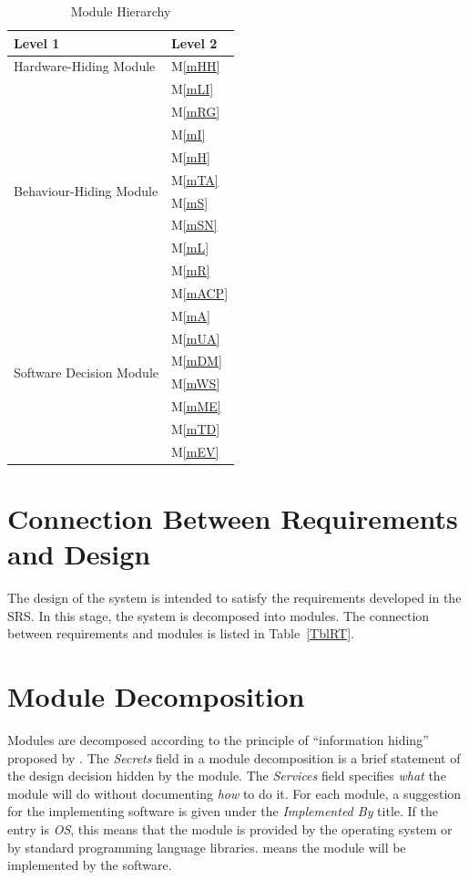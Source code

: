 \documentclass[12pt, titlepage]{article}
\newcommand{\mref}[1]{M\ref{#1}}
\begin{document}
\begin{table}[H]
\centering
\begin{tabular}{p{} p{}}
\toprule
\textbf{Level 1} & \textbf{Level 2}\\
\midrule

{Hardware-Hiding Module}
& \mref{mHH}\\
\midrule

\multirow{10}{0.3\textwidth}{Behaviour-Hiding Module} 
& \mref{mLI}\\
& \mref{mRG}\\
& \mref{mI}\\
& \mref{mH}\\
& \mref{mTA}\\
& \mref{mS}\\
& \mref{mSN}\\
& \mref{mL}\\
& \mref{mR}\\
& \mref{mACP}\\
\midrule

\multirow{6}{0.3\textwidth}{Software Decision Module} 
& \mref{mA}\\
& \mref{mUA}\\
& \mref{mDM}\\
& \mref{mWS}\\
& \mref{mME}\\
& \mref{mTD}\\
& \mref{mEV}\\
\bottomrule

\end{tabular}
\caption{Module Hierarchy}
\label{TblMH}
\end{table}

\section{Connection Between Requirements and Design} \label{SecConnection}

The design of the system is intended to satisfy the requirements developed in
the SRS. In this stage, the system is decomposed into modules. The connection
between requirements and modules is listed in Table~\ref{TblRT}.

\section{Module Decomposition} \label{SecMD}

Modules are decomposed according to the principle of ``information hiding''
proposed by \citet{ParnasEtAl1984}. The \emph{Secrets} field in a module
decomposition is a brief statement of the design decision hidden by the
module. The \emph{Services} field specifies \emph{what} the module will do
without documenting \emph{how} to do it. For each module, a suggestion for the
implementing software is given under the \emph{Implemented By} title. If the
entry is \emph{OS}, this means that the module is provided by the operating
system or by standard programming language libraries.  \emph{\progname{}} means the
module will be implemented by the \progname{} software.
\end{document}
